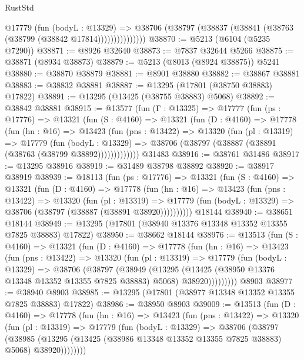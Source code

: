 \begin{lexlean}{RustStd}
\begin{coremodule}
                  @17779
                    (fun (bodyL : @13329) =>
                    @38706 (@38797 (@38837 (@38841 (@38763 (@38799 (@38842 @17814)))))))))))))))
@38870 := @5213 (@6104 (@5235 @7290))
@38871 := @8926 @32640
@38873 := @7837 @32644 @5266
@38875 := @38871 (@8934 @38873)
@38879 := @5213 (@8013 (@8924 @38875)) @5241
@38880 := @38870 @38879
@38881 := @8901 @38880
@38882 := @38867 @38881
@38883 := @38832 @38881
@38887 := @13295 (@17801 (@38750 @38883) @17822)
@38891 := @13295 (@13425 (@38755 @38883) @5068)
@38892 := @38842 @38881
@38915 := @13577
    (fun (Γ : @13325) =>
    @17777
      (fun (ps : @17776) =>
      @13321
        (fun (S : @4160) =>
        @13321
          (fun (D : @4160) =>
          @17778
            (fun (hn : @16) =>
            @13423
              (fun (pns : @13422) =>
              @13320
                (fun (pl : @13319) =>
                @17779
                  (fun (bodyL : @13329) =>
                  @38706 (@38797 (@38887 (@38891 (@38763 (@38799 @38892)))))))))))))
    @31483
@38916 := @38761 @31486
@38917 := @13295 @38916
@38919 := @31489 @38798 @38892
@38920 := @38917 @38919
@38939 := @18113
    (fun (ps : @17776) =>
    @13321
      (fun (S : @4160) =>
      @13321
        (fun (D : @4160) =>
        @17778
          (fun (hn : @16) =>
          @13423
            (fun (pns : @13422) =>
            @13320
              (fun (pl : @13319) =>
              @17779 (fun (bodyL : @13329) => @38706 (@38797 (@38887 (@38891 @38920))))))))))
    @18144
@38940 := @38651 @18144
@38949 := @13295 (@17801 (@38940 @13376 @13348 @13352 @13355 @7825 @38883) @17822)
@38950 := @38662 @18144
@38976 := @13513
    (fun (S : @4160) =>
    @13321
      (fun (D : @4160) =>
      @17778
        (fun (hn : @16) =>
        @13423
          (fun (pns : @13422) =>
          @13320
            (fun (pl : @13319) =>
            @17779
              (fun (bodyL : @13329) =>
              @38706
                (@38797
                  (@38949
                    (@13295
                      (@13425 (@38950 @13376 @13348 @13352 @13355 @7825 @38883) @5068)
                      @38920)))))))))
    @8903
@38977 := @38940 @8903
@38985 := @13295 (@17801 (@38977 @13348 @13352 @13355 @7825 @38883) @17822)
@38986 := @38950 @8903
@39009 := @13513
    (fun (D : @4160) =>
    @17778
      (fun (hn : @16) =>
      @13423
        (fun (pns : @13422) =>
        @13320
          (fun (pl : @13319) =>
          @17779
            (fun (bodyL : @13329) =>
            @38706
              (@38797
                (@38985
                  (@13295 (@13425 (@38986 @13348 @13352 @13355 @7825 @38883) @5068) @38920))))))))

\end{coremodule}
\end{lexlean}
